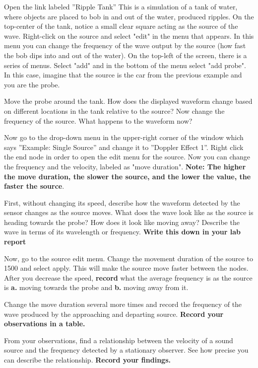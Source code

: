 \begin{steps}
	\item Open the link labeled ''Ripple Tank'' This is a simulation of a tank of water, where objects are placed to bob in and out of the water, produced ripples. On the top-center of the tank, notice a small clear square acting as the source of the wave. Right-click on the source and select "edit" in the menu that appears. In this menu you can change the frequency of the wave output by the source (how fast the bob dips into and out of the water). On the top-left of the screen, there is a series of menus. Select "add" and in the bottom of the menu select "add probe". In this case, imagine that the source is the car from the previous example and you are the probe. 
	
	\item Move the probe around the tank. How does the displayed waveform change based on different locations in the tank relative to the source? Now change the frequency of the source. What happens to the waveform now?
	
	\item Now go to the drop-down menu in the upper-right corner of the window which says ''Example: Single Source'' and change it to ''Doppler Effect 1''. Right click the end node in order to open the edit menu for the source. Now you can change the frequency and the velocity, labeled as "move duration". \textbf{Note: The higher the move duration, the slower the source, and the lower the value, the faster the source}. 
	
	\item First, without changing its speed, describe how the waveform detected by the sensor changes as the source moves. What does the wave look like as the source is heading towards the probe? How does it look like moving away? Describe the wave in terms of its wavelength or frequency. \textbf{Write this down in your lab report}
	
	\item Now, go to the source edit menu. Change the movement duration of the source to 1500 and select apply. This will make the source move faster between the nodes. After you decrease the speed, \textbf{record} what the average frequency is as the source is \textbf{a.} moving towards the probe and \textbf{b.} moving away from it.
	
	\item Change the move duration several more times and record the frequency of the wave produced  by the approaching and departing source. \textbf{Record your observations in a table.}
	
	\item From your observations, find a relationship between the velocity of a sound source and the frequency detected by a stationary observer. See how precise you can describe the relationship. \textbf{Record your findings.}

\end{steps}

